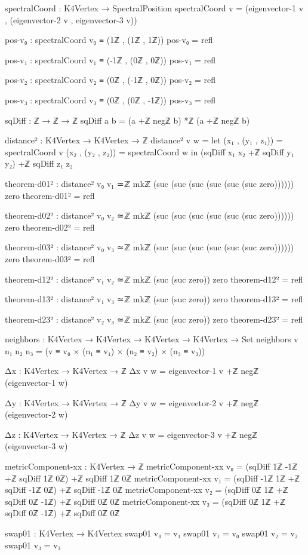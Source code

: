 \documentclass[11pt,a4paper]{book}
\begin{document}
\begin{code}
spectralCoord : K4Vertex → SpectralPosition
spectralCoord v = (eigenvector-1 v , (eigenvector-2 v , eigenvector-3 v))

pos-v₀ : spectralCoord v₀ ≡ (1ℤ , (1ℤ , 1ℤ))
pos-v₀ = refl

pos-v₁ : spectralCoord v₁ ≡ (-1ℤ , (0ℤ , 0ℤ))
pos-v₁ = refl

pos-v₂ : spectralCoord v₂ ≡ (0ℤ , (-1ℤ , 0ℤ))
pos-v₂ = refl

pos-v₃ : spectralCoord v₃ ≡ (0ℤ , (0ℤ , -1ℤ))
pos-v₃ = refl

sqDiff : ℤ → ℤ → ℤ
sqDiff a b = (a +ℤ negℤ b) *ℤ (a +ℤ negℤ b)

distance² : K4Vertex → K4Vertex → ℤ
distance² v w = 
  let (x₁ , (y₁ , z₁)) = spectralCoord v
      (x₂ , (y₂ , z₂)) = spectralCoord w
  in (sqDiff x₁ x₂ +ℤ sqDiff y₁ y₂) +ℤ sqDiff z₁ z₂

theorem-d01² : distance² v₀ v₁ ≃ℤ mkℤ (suc (suc (suc (suc (suc (suc zero)))))) zero
theorem-d01² = refl

theorem-d02² : distance² v₀ v₂ ≃ℤ mkℤ (suc (suc (suc (suc (suc (suc zero)))))) zero
theorem-d02² = refl

theorem-d03² : distance² v₀ v₃ ≃ℤ mkℤ (suc (suc (suc (suc (suc (suc zero)))))) zero
theorem-d03² = refl

theorem-d12² : distance² v₁ v₂ ≃ℤ mkℤ (suc (suc zero)) zero
theorem-d12² = refl

theorem-d13² : distance² v₁ v₃ ≃ℤ mkℤ (suc (suc zero)) zero
theorem-d13² = refl

theorem-d23² : distance² v₂ v₃ ≃ℤ mkℤ (suc (suc zero)) zero
theorem-d23² = refl

neighbors : K4Vertex → K4Vertex → K4Vertex → K4Vertex → Set
neighbors v n₁ n₂ n₃ = (v ≡ v₀ × (n₁ ≡ v₁) × (n₂ ≡ v₂) × (n₃ ≡ v₃))

Δx : K4Vertex → K4Vertex → ℤ
Δx v w = eigenvector-1 v +ℤ negℤ (eigenvector-1 w)

Δy : K4Vertex → K4Vertex → ℤ
Δy v w = eigenvector-2 v +ℤ negℤ (eigenvector-2 w)

Δz : K4Vertex → K4Vertex → ℤ
Δz v w = eigenvector-3 v +ℤ negℤ (eigenvector-3 w)

metricComponent-xx : K4Vertex → ℤ
metricComponent-xx v₀ = (sqDiff 1ℤ -1ℤ +ℤ sqDiff 1ℤ 0ℤ) +ℤ sqDiff 1ℤ 0ℤ
metricComponent-xx v₁ = (sqDiff -1ℤ 1ℤ +ℤ sqDiff -1ℤ 0ℤ) +ℤ sqDiff -1ℤ 0ℤ
metricComponent-xx v₂ = (sqDiff 0ℤ 1ℤ +ℤ sqDiff 0ℤ -1ℤ) +ℤ sqDiff 0ℤ 0ℤ
metricComponent-xx v₃ = (sqDiff 0ℤ 1ℤ +ℤ sqDiff 0ℤ -1ℤ) +ℤ sqDiff 0ℤ 0ℤ


swap01 : K4Vertex → K4Vertex
swap01 v₀ = v₁
swap01 v₁ = v₀
swap01 v₂ = v₂
swap01 v₃ = v₃


\end{code}
\end{document}
